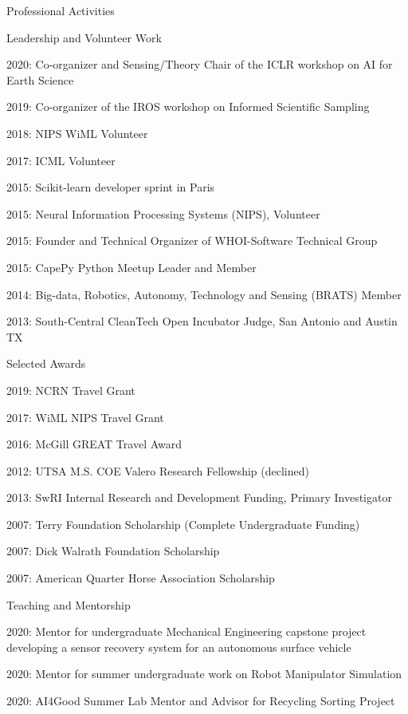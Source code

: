 \documentclass{resume} %
\begin{document}
\begin{rSection}{Professional Activities}
\begin{rSubsection}{Leadership and Volunteer Work}{}{}{}
\item{2020: Co-organizer and Sensing/Theory Chair of the ICLR workshop on AI for Earth Science}
\item{2019: Co-organizer of the IROS workshop on Informed Scientific Sampling}
\item{2018: NIPS WiML Volunteer}
\item{2017: ICML Volunteer}
\item{2015: Scikit-learn developer sprint in Paris}
\item{2015: Neural Information Processing Systems (NIPS), Volunteer}
\item{2015: Founder and Technical Organizer of WHOI-Software Technical Group}
\item{2015: CapePy Python Meetup Leader and Member}
\item{2014: Big-data, Robotics, Autonomy, Technology and Sensing (BRATS) Member}
\item{2013: South-Central CleanTech Open Incubator Judge, San Antonio and Austin TX}
\end{rSubsection}
\vspace{-.2cm}
\begin{rSubsection}{Selected Awards}{}{}{}
\item{2019: NCRN Travel Grant}
\item{2017: WiML NIPS Travel Grant} 
\item{2016: McGill GREAT Travel Award} 
\item{2012: UTSA M.S. COE Valero Research Fellowship (declined)}
\item{2013: SwRI Internal Research and Development Funding, Primary Investigator} 
\item{2007: Terry Foundation Scholarship (Complete Undergraduate Funding)} 
\item{2007: Dick Walrath Foundation Scholarship} 
\item{2007: American Quarter Horse Association Scholarship} 
\end{rSubsection}
\vspace{-.2cm}
\begin{rSubsection}{Teaching and Mentorship}{}{}{}
\item{2020: Mentor for undergraduate Mechanical Engineering capstone project developing a sensor recovery system for an autonomous surface vehicle}
\item{2020: Mentor for summer undergraduate work on Robot Manipulator Simulation}
\item{2020: AI4Good Summer Lab Mentor and Advisor for Recycling Sorting Project}

\end{rSubsection}
\end{rSection}
\end{document}
